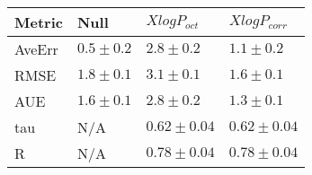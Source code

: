\begin{tabular}{| l |l |l | l |} 
\hline 
Metric & Null  & $XlogP_{oct}$ & $XlogP_{corr}$ \\ 
\hline 
AveErr & $ 0.5 \pm 0.2 $ & $ 2.8 \pm 0.2 $ & $ 1.1 \pm 0.2 $ \\ 
RMSE & $ 1.8 \pm 0.1 $ & $ 3.1 \pm 0.1 $ & $ 1.6 \pm 0.1 $ \\ 
AUE & $ 1.6 \pm 0.1 $ & $ 2.8 \pm 0.2 $ & $ 1.3 \pm 0.1 $ \\ 
tau & N/A & $ 0.62 \pm 0.04 $ & $ 0.62 \pm 0.04 $ \\ 
R & N/A & $ 0.78 \pm 0.04 $ & $ 0.78 \pm 0.04 $ \\ 
\hline
\end{tabular}
